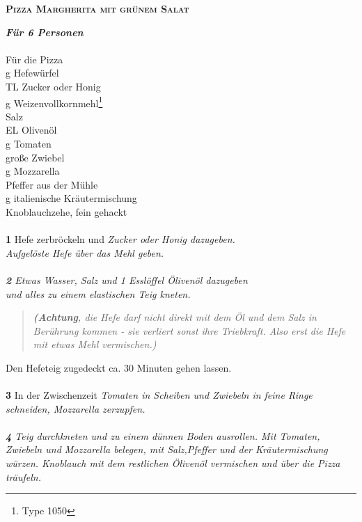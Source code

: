 \documentclass{article}
\begin{document}
\begin{center}
  {\large\scshape\bfseries Pizza Margherita mit grünem Salat}
\end{center}
\bigskip
{\bfseries\itshape Für 6 Personen}\\
\\
\small Für die Pizza\normalsize\newline
\\
 g Hefewürfel\\
 TL Zucker oder Honig\\
 g Weizenvollkornmehl\footnote{Type 1050}\\
\smallskip
Salz\\
 EL Olivenöl\\
 g Tomaten\\
 große Zwiebel\\
 g Mozzarella\\
\smallskip
Pfeffer aus der Mühle\\
 g italienische Kräutermischung\\
 Knoblauchzehe, fein gehackt\\
\bigskip
\\
{\Huge\textbf{1}}
  Hefe zerbröckeln und \slshape Zucker \upshape oder \slshape Honig \upshape
  dazugeben.\\
  Aufgelöste Hefe über das \slshape Mehl \upshape geben.\\
  \bigskip
  \\
{\huge\textbf{2}}
  Etwas {\sffamily Wasser}, \slshape Salz \upshape und \slshape 1 Esslöffel
  Ölivenöl \upshape dazugeben\\
  und alles zu einem elastischen Teig kneten.
  \begin{quote}
    {\it \textbf{(Achtung}, die Hefe darf nicht direkt mit dem Öl und dem Salz
    in Berührung kommen - sie verliert sonst ihre Triebkraft. Also erst die
    Hefe mit etwas Mehl vermischen.)}\\
  \end{quote}
  Den Hefeteig zugedeckt ca. 30 Minuten gehen lassen.\\
  \bigskip
  \\
{\LARGE\textbf{3}}
  In der Zwischenzeit \slshape Tomaten \upshape in Scheiben und \slshape
  Zwiebeln \upshape in feine Ringe schneiden, \slshape Mozzarella \upshape
  zerzupfen.\\
  \bigskip
  \\
{\Large\textbf{4}}
  Teig durchkneten und zu einem dünnen Boden ausrollen. Mit \slshape Tomaten,
  Zwiebeln \upshape und \slshape Mozzarella \upshape belegen, mit \slshape
  Salz,\upshape Pfeffer \upshape und der \slshape Kräutermischung \upshape
  würzen. \slshape Knoblauch \upshape mit dem restlichen \slshape Ölivenöl
  \upshape vermischen und über die Pizza träufeln.
\end{document}
